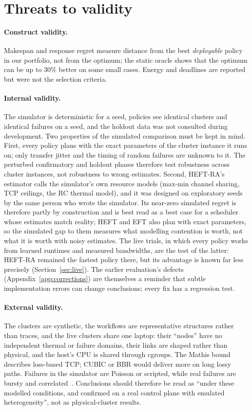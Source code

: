 \documentclass[12pt,a4paper]{report}
\begin{document}
\section{Threats to validity}

\paragraph{Construct validity.} Makespan and response regret measure
distance from the best \emph{deployable} policy in our portfolio, not from
the optimum; the static oracle shows that the optimum can be up to 30\%
better on some small cases. Energy and deadlines are reported but were not
the selection criteria.

\paragraph{Internal validity.} The simulator is deterministic for a seed,
policies see identical clusters and identical failures on a seed, and the
holdout data was not consulted during development. Two properties of the
simulated comparison must be kept in mind. First, every policy plans with
the exact parameters of the cluster instance it runs on; only transfer
jitter and the timing of random failures are unknown to it. The perturbed
confirmatory and holdout phases therefore test robustness across cluster
instances, not robustness to wrong estimates. Second, HEFT-RA's estimator
calls the simulator's own resource models (max-min channel sharing, TCP
ceilings, the RC thermal model), and it was designed on exploratory seeds
by the same person who wrote the simulator. Its near-zero simulated regret
is therefore partly by construction and is best read as a best case for a
scheduler whose estimates match reality; HEFT and EFT also plan with exact
parameters, so the simulated gap to them measures what modelling
contention is worth, not what it is worth with noisy estimates. The live
trials, in which every policy works from learned runtimes and measured
bandwidths, are the test of the latter: HEFT-RA remained the fastest
policy there, but its advantage is known far less precisely
(Section~\ref{sec:live}). The earlier
evaluation's defects (Appendix~\ref{app:corrections}) are themselves a
reminder that subtle implementation errors can change conclusions; every
fix has a regression test.

\paragraph{External validity.} The clusters are synthetic, the workflows
are representative structures rather than traces, and the live clusters
share one laptop: their ``nodes'' have no independent thermal or failure
domains, their links are shaped rather than physical, and the host's CPU
is shared through cgroups. The Mathis bound describes loss-based TCP; CUBIC
or BBR would deliver more on long lossy paths. Failures in the simulator
are Poisson or scripted, while real failures are bursty and
correlated~\cite{schroeder2010failures}. Conclusions should therefore be
read as ``under these modelled conditions, and confirmed on a real control
plane with emulated heterogeneity'', not as physical-cluster results.
\end{document}
